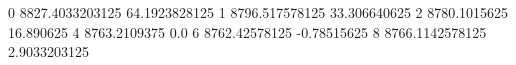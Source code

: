 0 8827.4033203125 64.1923828125
1 8796.517578125 33.306640625
2 8780.1015625 16.890625
4 8763.2109375 0.0
6 8762.42578125 -0.78515625
8 8766.1142578125 2.9033203125

